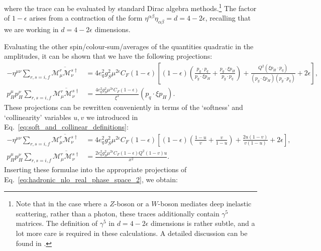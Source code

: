 \documentclass[withindex,glossary]{cam-thesis}
\begin{document}
where the trace can be evaluated by standard Dirac algebra methods.\footnote{Note that in the case where a $Z$-boson or a $W$-boson mediates deep inelastic scattering, rather than a photon, these traces additionally contain $\gamma^5$ matrices. The definition of $\gamma^5$ in $d = 4 - 2\epsilon$ dimensions is rather subtle, and a lot more care is required in these calculations. A detailed discussion can be found in \cite{Collins:1984xc}.} The factor of $1-\epsilon$ arises from a contraction of the form $\eta^{\alpha\beta} \eta_{\alpha\beta} = d = 4 - 2\epsilon$, recalling that we are working in $d = 4-2\epsilon$ dimensions.

Evaluating the other spin/colour-sum/averages of the quantities quadratic in the amplitudes, it can be shown that we have the following projections:
\begin{align}
-\eta^{\mu\nu} \sum_{r,s=i,f} \overline{\mathcal{M}_{\mu}^r \mathcal{M}_{\nu}^{s\dagger}} &= 4 e_q^2 g_S^2 \mu^{2\epsilon} C_F (1-\epsilon) \left[ (1-\epsilon) \left( \frac{p_g \cdot p_q}{p_g \cdot \xi p_H} + \frac{p_g \cdot \xi p_H}{p_g \cdot p_q}\right) + \frac{Q^2 (\xi p_H \cdot p_q)}{(p_g \cdot \xi p_H) (p_g \cdot p_q)} + 2\epsilon\right],\\[1.5ex]
p_H^{\mu} p_H^{\nu} \sum_{r,s=i,f} \overline{\mathcal{M}_{\mu}^r \mathcal{M}_{\nu}^{s\dagger}} &= \frac{4 e_q^2 g_S^2 \mu^{2\epsilon} C_F (1-\epsilon)}{\xi^2} (p_q \cdot \xi p_H).
\end{align}
These projections can be rewritten conveniently in terms of the `softness' and `collinearity' variables $u,v$ we introduced in Eq.~\eqref{eq:soft_and_collinear_definitions}:
\begin{align}
-\eta^{\mu\nu} \sum_{r,s=i,f} \overline{\mathcal{M}_{\mu}^r \mathcal{M}_{\nu}^{s\dagger}} &= 4 e_q^2 g_S^2 \mu^{2\epsilon} C_F (1-\epsilon) \left[ (1-\epsilon) \left( \frac{1-u}{v} + \frac{v}{1-u}\right) + \frac{2u(1-v)}{v(1-u)} + 2\epsilon\right],\\[1.5ex]
p_H^{\mu} p_H^{\nu} \sum_{r,s=i,f} \overline{\mathcal{M}_{\mu}^r \mathcal{M}_{\nu}^{s\dagger}} &= \frac{2 e_q^2 g_S^2 \mu^{2\epsilon} C_F (1-\epsilon) Q^2 (1-v) u}{x^2}.
\end{align}
Inserting these formulae into the appropriate projections of Eq.~\eqref{eq:hadronic_nlo_real_phase_space_2}, we obtain:
\end{document}
